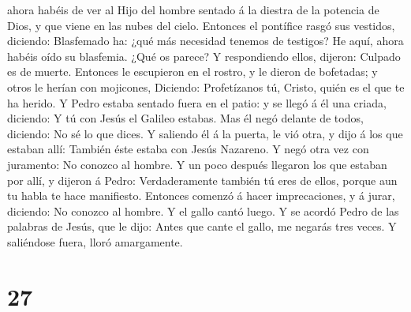ahora habéis de ver al Hijo del hombre sentado á la diestra de la
potencia de Dios, y que viene en las nubes del cielo. 
Entonces el pontífice rasgó sus vestidos, diciendo: Blasfemado ha: ¿qué
más necesidad tenemos de testigos? He aquí, ahora habéis oído su
blasfemia.  ¿Qué os parece? Y respondiendo ellos, dijeron:
Culpado es de muerte.  Entonces le escupieron en el rostro,
y le dieron de bofetadas; y otros le herían con mojicones, 
Diciendo: Profetízanos tú, Cristo, quién es el que te ha herido.
 Y Pedro estaba sentado fuera en el patio: y se llegó á él
una criada, diciendo: Y tú con Jesús el Galileo estabas. 
Mas él negó delante de todos, diciendo: No sé lo que dices.
 Y saliendo él á la puerta, le vió otra, y dijo á los que
estaban allí: También éste estaba con Jesús Nazareno.  Y
negó otra vez con juramento: No conozco al hombre.  Y un
poco después llegaron los que estaban por allí, y dijeron á Pedro:
Verdaderamente también tú eres de ellos, porque aun tu habla te hace
manifiesto.  Entonces comenzó á hacer imprecaciones, y á
jurar, diciendo: No conozco al hombre. Y el gallo cantó luego.
 Y se acordó Pedro de las palabras de Jesús, que le dijo:
Antes que cante el gallo, me negarás tres veces. Y saliéndose fuera,
lloró amargamente.

\hypertarget{section-26}{%
\section{27}\label{section-26}}

